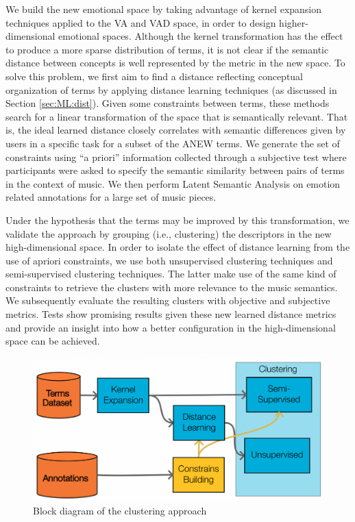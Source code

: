 We build the new emotional space by taking advantage of kernel expansion techniques applied to the VA and VAD space, in order to design higher-dimensional emotional spaces.  Although the kernel transformation has the effect to produce a more sparse distribution of terms, it is not clear if the  semantic distance between concepts is well represented by the metric in the new space. To solve this problem, we first aim to find a distance reflecting conceptual organization of terms by applying distance learning techniques \cite{xing2003distance, bar2003learning, goldberger2004neighbourhood} (as discussed in Section \ref{sec:ML:dist}). Given some constraints between terms, these methods search for a linear transformation of the space that is semantically relevant. That is, the ideal learned distance closely correlates with semantic differences given by users in a specific task for a subset of the ANEW terms. We generate the set of constraints using ``a priori'' information collected through a subjective test where participants were asked to specify the semantic similarity between pairs of terms in the context of music. We then perform Latent Semantic Analysis on emotion related annotations for a large set of music pieces. 

Under the hypothesis that the terms may be improved by this transformation, we validate the approach by grouping (i.e.,  clustering) the descriptors in the new high-dimensional space. In order to isolate the effect of distance learning from the use of apriori constraints, we use both unsupervised clustering techniques and semi-supervised clustering techniques. The latter make use of the same kind of constraints to retrieve the clusters with more relevance to the music semantics. We subsequently evaluate the resulting clusters with objective and subjective metrics. Tests show promising results given these new learned distance metrics and provide an insight into how a better configuration in the high-dimensional space can be achieved. 


 \begin{figure}[tb] 
 	\centering 
 	\includegraphics[width=0.95\columnwidth]{img/ANEW/scheme4.pdf}
 	\caption{Block diagram of the clustering approach}
 	\label{fig:ANEWblockdiag}
 \end{figure}	

